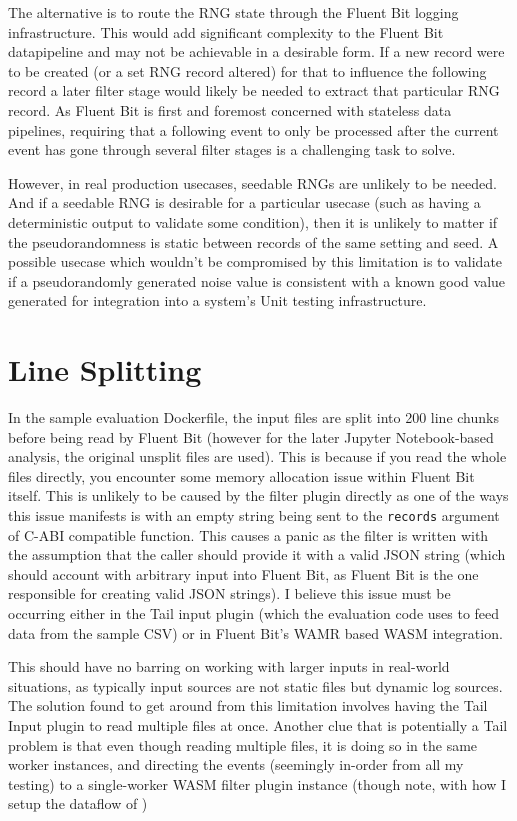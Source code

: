 The alternative is to route the RNG state through the Fluent Bit logging infrastructure. This would add significant complexity to the Fluent Bit datapipeline and may not be achievable in a desirable form. If a new record were to be created (or a set RNG record altered) for that to influence the following record a later filter stage would likely be needed to extract that particular RNG record. As Fluent Bit is first and foremost concerned with stateless data pipelines, requiring that a following event to only be processed after the current event has gone through several filter stages is a challenging task to solve. 

However, in real production usecases, seedable RNGs are unlikely to be needed. And if a seedable RNG is desirable for a particular usecase (such as having a deterministic output to validate some condition), then it is unlikely to matter if the pseudorandomness is static between records of the same setting and seed. A possible usecase which wouldn't be compromised by this limitation is to validate if a pseudorandomly generated noise value is consistent with a known good value generated for integration into a system's Unit testing infrastructure. 

\section{Line Splitting} \label{splitting}
In the sample evaluation Dockerfile, the input files are split into 200 line chunks before being read by Fluent Bit (however for the later Jupyter Notebook-based analysis, the original unsplit files are used). This is because if you read the whole files directly, you encounter some memory allocation issue within Fluent Bit itself. This is unlikely to be caused by the filter plugin directly as one of the ways this issue manifests is with an empty string being sent to the \texttt{records} argument of C-ABI compatible function. This causes a panic as the filter is written with the assumption that the caller should provide it with a valid JSON string (which should account with arbitrary input into Fluent Bit, as Fluent Bit is the one responsible for creating valid JSON strings). I believe this issue must be occurring either in the Tail input plugin (which the evaluation code uses to feed data from the sample CSV) or in Fluent Bit's WAMR based WASM integration. 

This should have no barring on working with larger inputs in real-world situations, as typically input sources are not static files but dynamic log sources. The solution found to get around from this limitation involves having the Tail Input plugin to read multiple files at once. Another clue that is potentially a Tail problem is that even though reading multiple files, it is doing so in the same worker instances, and directing the events (seemingly in-order from all my testing) to a single-worker WASM filter plugin instance (though note, with how I setup the dataflow of ) 

